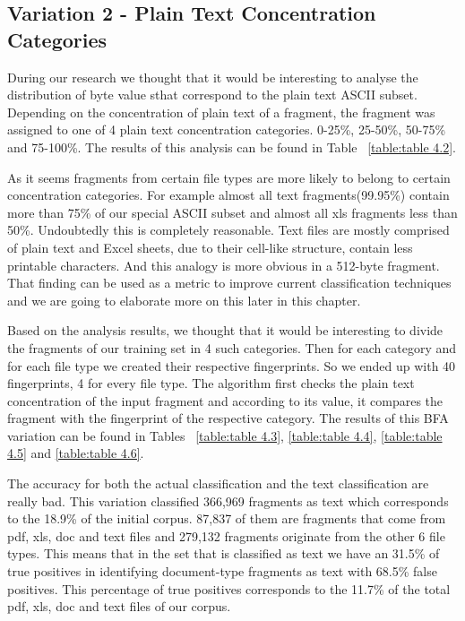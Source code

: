 


\subsection{Variation 2 - Plain Text Concentration Categories}
During our research we thought that it would be interesting to analyse the distribution of byte value sthat correspond to the plain text ASCII subset. Depending on the concentration of plain text of a fragment, the fragment was assigned to one of 4 plain text concentration categories. 0-25\%, 25-50\%, 50-75\% and 75-100\%. The results of this analysis can be found in Table ~\ref{table:table 4.2}.

As it seems fragments from certain file types are more likely to belong to certain concentration categories. For example almost all text fragments(99.95\%) contain more than 75\% of our special ASCII subset and almost all xls fragments less than 50\%. Undoubtedly this is completely reasonable. Text files are mostly comprised of plain text and Excel sheets, due to their cell-like structure, contain less printable characters. And this analogy is more obvious in a 512-byte fragment. That finding can be used as a metric to improve current classification techniques and we are going to elaborate more on this later in this chapter.



Based on the analysis results, we thought that it would be interesting to divide the fragments of our training set in 4 such categories. Then for each category and for each file type we created their respective fingerprints. So we ended up with 40 fingerprints, 4 for every file type. The algorithm first checks the plain text concentration of the input fragment and according to its value, it compares the fragment with the fingerprint of the respective category. The results of this BFA variation can be found in Tables ~\ref{table:table 4.3}, \ref{table:table 4.4}, \ref{table:table 4.5} and \ref{table:table 4.6}.

The accuracy for both the actual classification and the text classification are really bad. This variation classified 366,969 fragments as text which corresponds to the 18.9\% of the initial corpus. 87,837 of them are fragments that come from pdf, xls, doc and text files and 279,132 fragments originate from the other 6 file types. This means that in the set that is classified as text we have an 31.5\% of true positives in identifying document-type fragments as text with 68.5\% false positives. This percentage of true positives corresponds to the 11.7\% of the total pdf, xls, doc and text files of our corpus.


